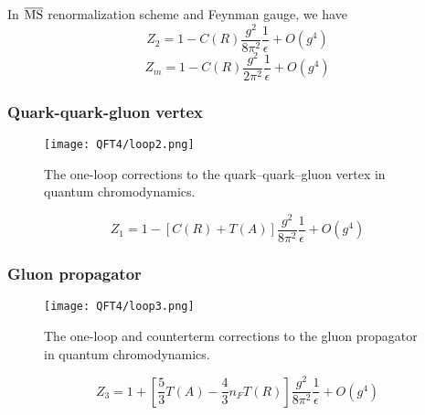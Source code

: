 \noindent
In $\overline{\rm MS}$ renormalization scheme and Feynman gauge, we have
\[Z_2 = 1 - C(R)\frac{g^2}{8\pi^2}\frac{1}{\epsilon} + O(g^4)\]
\[Z_m = 1 - C(R)\frac{g^2}{2\pi^2}\frac{1}{\epsilon} + O(g^4)\]

\subsubsection{Quark-quark-gluon vertex}
\begin{figure}[!h]
	\centering
	\texttt{[image: QFT4/loop2.png]}
	\caption{The one-loop corrections to the quark–quark–gluon vertex in quantum chromodynamics.}
\end{figure}
\[Z_1 = 1 - [C(R) + T(A)]\frac{g^2}{8\pi^2}\frac{1}{\epsilon} + O(g^4)\]

\subsubsection{Gluon propagator}
\begin{figure}[!h]
	\centering
	\texttt{[image: QFT4/loop3.png]}
	\caption{The one-loop and counterterm corrections to the gluon propagator in quantum chromodynamics.}
\end{figure}
\[Z_3 = 1 + \left[\frac{5}{3}T(A) - \frac{4}{3}n_F T(R)\right]\frac{g^2}{8\pi^2}\frac{1}{\epsilon} + O(g^4)\]

